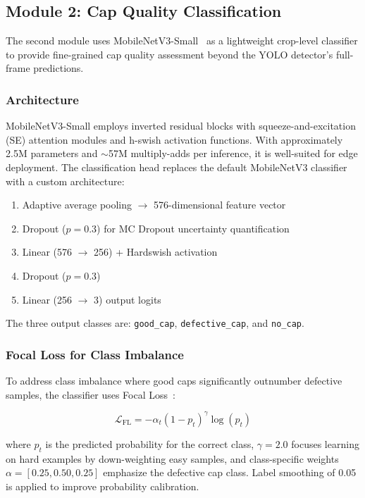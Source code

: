\documentclass{ieeeaccess}
\begin{document}
\subsection{Module 2: Cap Quality Classification}

The second module uses MobileNetV3-Small~\cite{howard2019mobilenetv3} as a lightweight crop-level classifier to provide fine-grained cap quality assessment beyond the YOLO detector's full-frame predictions.

\subsubsection{Architecture}
MobileNetV3-Small employs inverted residual blocks with squeeze-and-excitation (SE) attention modules and h-swish activation functions. With approximately 2.5M parameters and $\sim$57M multiply-adds per inference, it is well-suited for edge deployment. The classification head replaces the default MobileNetV3 classifier with a custom architecture:

\begin{enumerate}
    \item Adaptive average pooling $\rightarrow$ 576-dimensional feature vector
    \item Dropout ($p = 0.3$) for MC Dropout uncertainty quantification
    \item Linear (576 $\rightarrow$ 256) + Hardswish activation
    \item Dropout ($p = 0.3$)
    \item Linear (256 $\rightarrow$ 3) output logits
\end{enumerate}

The three output classes are: \texttt{good\_cap}, \texttt{defective\_cap}, and \texttt{no\_cap}.

\subsubsection{Focal Loss for Class Imbalance}
To address class imbalance where good caps significantly outnumber defective samples, the classifier uses Focal Loss~\cite{lin2017focal}:

\begin{equation}
\mathcal{L}_{\text{FL}} = -\alpha_t (1 - p_t)^\gamma \log(p_t)
\label{eq:focal}
\end{equation}

\noindent where $p_t$ is the predicted probability for the correct class, $\gamma = 2.0$ focuses learning on hard examples by down-weighting easy samples, and class-specific weights $\alpha = [0.25, 0.50, 0.25]$ emphasize the defective cap class. Label smoothing of 0.05 is applied to improve probability calibration.
\end{document}
